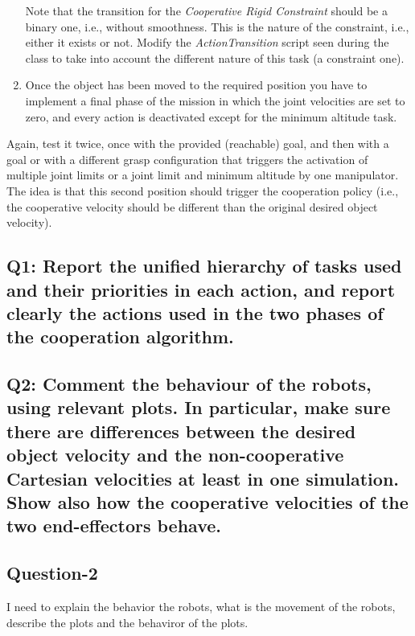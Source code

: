 \documentclass{article}
\begin{document}
\begin{enumerate}
Note that the transition for the \textit{Cooperative Rigid Constraint} should be a binary one, i.e., without smoothness. This is the nature of the constraint, i.e., either it exists or not. Modify the \emph{ActionTransition} script seen during the class to take into account the different nature of this task (a constraint one).

\item Once the object has been moved to the required position you have to implement a final phase of the mission in which the joint velocities are set to zero, and every action is deactivated except for the minimum altitude task.
\end{enumerate}

 Again, test it twice, once with the provided (reachable) goal, and then with a goal or with a different grasp configuration that triggers the activation of multiple joint limits or a joint limit and minimum altitude by one manipulator. The idea is that this second position should trigger the cooperation policy (i.e., the cooperative velocity should be different than the original desired object velocity).

\subsection{Q1: Report the unified hierarchy of tasks used and their priorities in each action, and report clearly the actions used in the two phases of the cooperation algorithm.}

\subsection{Q2: Comment the behaviour of the robots, using relevant plots. In particular, make sure there are differences between the desired object velocity and the non-cooperative Cartesian velocities at least in one simulation. Show also how the cooperative velocities of the two end-effectors behave.}



		
\clearpage


\subsection{Question-2}
I need to explain the behavior the robots, what is the movement of the robots, describe the plots and the behaviror of the plots.
\end{document}
